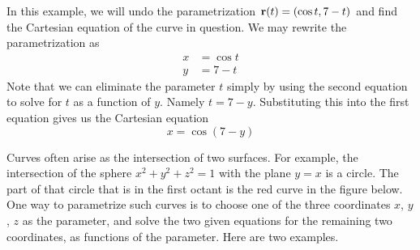 \begin{eg}[Unparametrization of  $\vr(t)=(\cos t, 7-t)$] \label{eg:unparam}
In this example, we will undo the parametrization $\vr(t)=(\cos t, 7-t)$
and find the Cartesian equation of the curve in question. We may rewrite the
parametrization as
\begin{align*}
x&=\cos t \\
y&=7-t
\end{align*}
Note that we can eliminate the parameter $t$ simply by using the second equation 
to solve for $t$ as a function of $y$. Namely $t=7-y$. Substituting this
into the first equation  gives us the Cartesian equation
\begin{equation*}
x=\cos(7-y)
\end{equation*}
\end{eg}

Curves often arise as the intersection of two surfaces. For example,
the intersection of the sphere $x^2+y^2+z^2=1$
with the plane $y=x$ is a circle. The part of that circle that is
in the first octant is the red curve in the figure below.
One way to parametrize such curves is to
choose one of the three coordinates $x$, $y$, $z$ as the parameter,
and solve the two given equations for the remaining two coordinates,
as functions of the parameter. Here are two examples.

